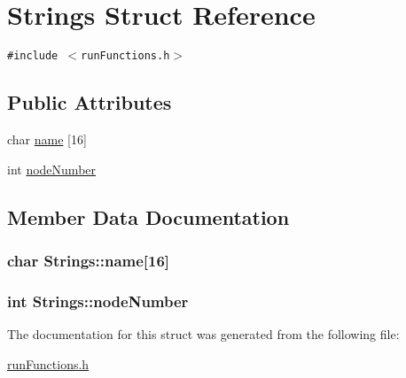\hypertarget{structStrings}{
\section{Strings Struct Reference}
\label{structStrings}
}
{\tt \#include $<$runFunctions.h$>$}

\subsection*{Public Attributes}
\begin{CompactItemize}
\item 
char \hyperlink{structStrings_f34a2ea06df43a00fc71f611991e3038}{name} \mbox{[}16\mbox{]}
\item 
int \hyperlink{structStrings_a7db63fed070e6de971507ae69def30e}{nodeNumber}
\end{CompactItemize}


\subsection{Member Data Documentation}
\hypertarget{structStrings_f34a2ea06df43a00fc71f611991e3038}{
\subsubsection[{name}]{\setlength{\rightskip}{0pt plus 5cm}char {\bf Strings::name}\mbox{[}16\mbox{]}}}
\label{structStrings_f34a2ea06df43a00fc71f611991e3038}


\hypertarget{structStrings_a7db63fed070e6de971507ae69def30e}{
\subsubsection[{nodeNumber}]{\setlength{\rightskip}{0pt plus 5cm}int {\bf Strings::nodeNumber}}}
\label{structStrings_a7db63fed070e6de971507ae69def30e}




The documentation for this struct was generated from the following file:\begin{CompactItemize}
\item 
\hyperlink{runFunctions_8h}{runFunctions.h}\end{CompactItemize}
